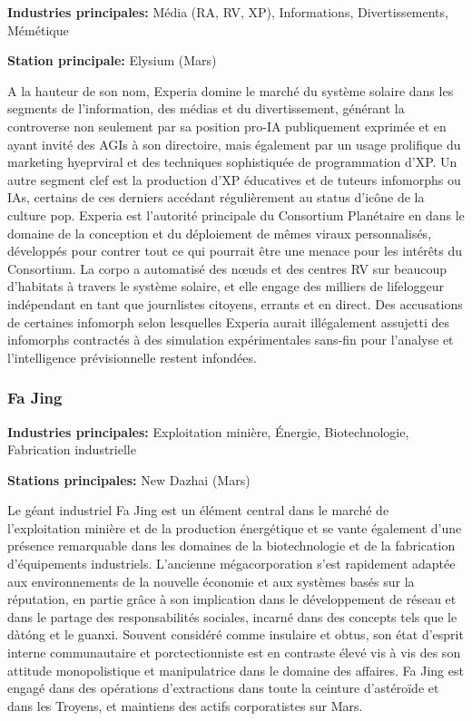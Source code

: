                  \textbf{Industries principales:} Média (RA, RV, XP), Informations, Divertissements, Mémétique 

                  \textbf{Station principale:} Elysium (Mars) 

                  A la hauteur de son nom, Experia domine le marché du système solaire dans les segments de l'information, des médias et du divertissement, générant la controverse non seulement par sa position pro-IA publiquement exprimée et en ayant invité des AGIs à son directoire, mais également par un usage prolifique du marketing hyeprviral et des techniques sophistiquée de programmation d'XP. Un autre segment clef est la production d'XP éducatives et de tuteurs infomorphs ou IAs, certains de ces derniers accédant régulièrement au status d'icône de la culture pop. Experia est l'autorité principale du Consortium Planétaire en dans le domaine de la conception et du déploiement de mêmes viraux personnalisés, développés pour contrer tout ce qui pourrait être une menace pour les intérêts du Consortium. La corpo a automatisé des nœuds et des centres RV sur beaucoup d'habitats à travers le système solaire, et elle engage des milliers de lifeloggeur indépendant en tant que journlistes citoyens, errants et en direct. Des accusations de certaines infomorph selon lesquelles Experia aurait illégalement assujetti des infomorphs contractés à des simulation expérimentales sans-fin pour l'analyse et l'intelligence prévisionnelle restent infondées. 

                  \subsubsection{Fa Jing} \label{sec:fa-jing} 

                  \textbf{Industries principales:} Exploitation minière, Énergie, Biotechnologie, Fabrication industrielle 

                  \textbf{Stations principales:} New Dazhai (Mars) 

                  Le géant industriel Fa Jing est un élément central dans le marché de l'exploitation minière et de la production énergétique et se vante également d'une présence remarquable dans les domaines de la biotechnologie et de la fabrication d'équipements industriels. L'ancienne mégacorporation s'est rapidement adaptée aux environnements de la nouvelle économie et aux systèmes basés sur la réputation, en partie grâce à son implication dans le développement de réseau et dans le partage des responsabilités sociales, incarné dans des concepts tels que le dàtóng et le guanxi. Souvent considéré comme insulaire et obtus, son état d'esprit interne communautaire et porctectionniste est en contraste élevé vis à vis des son attitude monopolistique et manipulatrice dans le domaine des affaires. Fa Jing est engagé dans des opérations d'extractions dans toute la ceinture d'astéroïde et dans les Troyens, et maintiens des actifs corporatistes sur Mars. 

